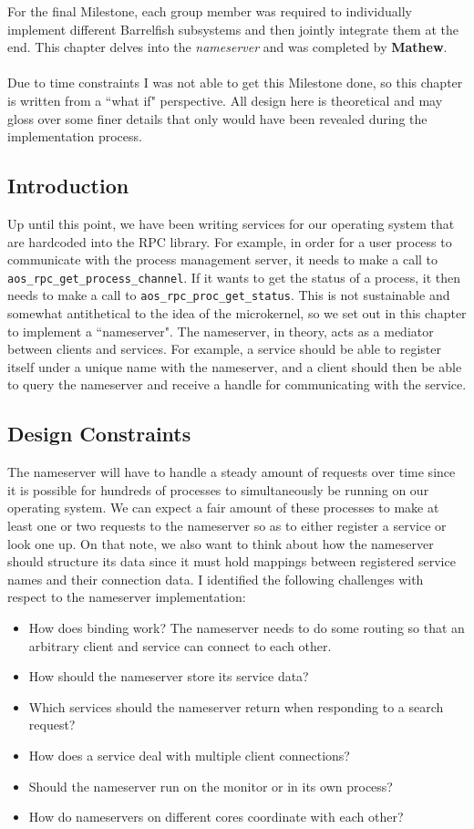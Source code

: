 For the final Milestone, each group member was required to individually implement different Barrelfish subsystems and then jointly integrate them at the end. This chapter delves into the \textit{nameserver} and was completed by \textbf{Mathew}.
\\\\
Due to time constraints I was not able to get this Milestone done, so this chapter is written from a ``what if" perspective. All design here is theoretical and may gloss over some finer details that only would have been revealed during the implementation process.

\subsection{Introduction}
Up until this point, we have been writing services for our operating system that are hardcoded into the RPC library. For example, in order for a user process to communicate with the process management server, it needs to make a call to \texttt{aos\_rpc\_get\_process\_channel}. If it wants to get the status of a process, it then needs to make a call to \texttt{aos\_rpc\_proc\_get\_status}. This is not sustainable and somewhat antithetical to the idea of the microkernel, so we set out in this chapter to implement a ``nameserver". The nameserver, in theory, acts as a mediator between clients and services. For example, a service should be able to register itself under a unique name with the nameserver, and a client should then be able to query the nameserver and receive a handle for communicating with the service.

\subsection{Design Constraints}
The nameserver will have to handle a steady amount of requests over time since it is possible for hundreds of processes to simultaneously be running on our operating system. We can expect a fair amount of these processes to make at least one or two requests to the nameserver so as to either register a service or look one up. On that note, we also want to think about how the nameserver should structure its data since it must hold mappings between registered service names and their connection data. I identified the following challenges with respect to the nameserver implementation:
\begin{itemize}[itemsep=0pt]
    \item How does binding work? The nameserver needs to do some routing so that an arbitrary client and service can connect to each other.
    \item How should the nameserver store its service data?
    \item Which services should the nameserver return when responding to a search request?
    \item How does a service deal with multiple client connections?
    \item Should the nameserver run on the monitor or in its own process?
    \item How do nameservers on different cores coordinate with each other?
\end{itemize}

